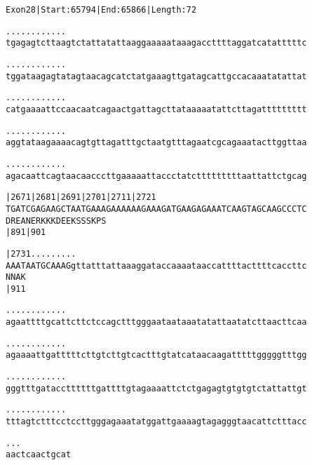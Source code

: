 \documentclass{article}
\begin{document}
\newpage
\begin{alltt}
Exon 28 | Start: 65794 | End: 65866 | Length: 72

.    .    .    .    .    .    .    .    .    .    .    .
tgagagtcttaagtctattatattaaggaaaaataaagaccttttaggatcatatttttc



.    .    .    .    .    .    .    .    .    .    .    .
tggataagagtatagtaacagcatctatgaaagttgatagcattgccacaaatatattat



.    .    .    .    .    .    .    .    .    .    .    .
catgaaaattccaacaatcagaactgattagcttataaaaatattcttagattttttttt



.    .    .    .    .    .    .    .    .    .    .    .
aggtataagaaaacagtgttagatttgctaatgtttagaatcgcagaaatacttggttaa



.    .    .    .    .    .    .    .    .    .    .    .
agacaattcagtaacaacccttgaaaaattaccctatctttttttttaattattctgcag



    |2671     |2681     |2691     |2701     |2711     |2721
TGATCGAGAAGCTAATGAAAGAAAAAAGAAAGATGAAGAGAAATCAAGTAGCAAGCCCTC
 D  R  E  A  N  E  R  K  K  K  D  E  E  K  S  S  S  K  P  S
    |891                          |901

    |2731        .    .    .    .    .    .    .    .    .
AAATAATGCAAAGgttatttattaaaggataccaaaataaccattttacttttcaccttc
 N  N  A  K
    |911

  .    .    .    .    .    .    .    .    .    .    .    .
agaattttgcattcttctccagctttgggaataataaatatattaatatcttaacttcaa



\end{alltt}
\newpage
\begin{alltt}
  .    .    .    .    .    .    .    .    .    .    .    .
agaaaattgatttttcttgtcttgtcactttgtatcataacaagatttttgggggtttgg



  .    .    .    .    .    .    .    .    .    .    .    .
gggtttgataccttttttgattttgtagaaaattctctgagagtgtgtgtctattattgt



  .    .    .    .    .    .    .    .    .    .    .    .
tttagtctttcctccttgggagaaatatggattgaaaagtagagggtaacattctttacc



  .    .    .
aactcaactgcat


\end{alltt}
\end{document}
